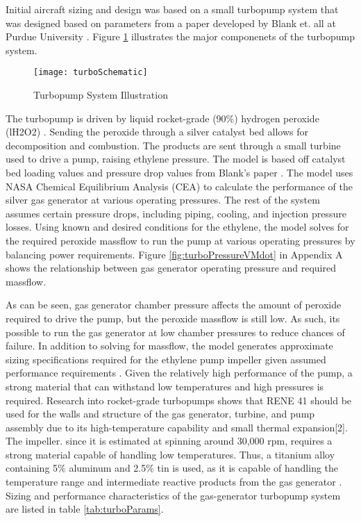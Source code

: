 Initial aircraft sizing and design was based on a small turbopump system that was designed based on parameters from a paper developed by Blank et. all at Purdue University \cite{catalyst}. Figure \ref{fig:turboSchematic} illustrates the major componenets of the turbopump system.

\begin{figure}[H]
\texttt{[image: turboSchematic]}
\caption{Turbopump System Illustration}
\label{fig:turboSchematic}
\end{figure}
 
The turbopump is driven by liquid rocket-grade (90\%) hydrogen peroxide (lH2O2) . Sending the peroxide through a silver catalyst bed allows for decomposition and combustion. The products are sent through a small turbine used to drive a pump, raising ethylene pressure. The model is based off catalyst bed loading values and pressure drop values from Blank’s paper \cite{catalyst}. The model uses NASA Chemical Equilibrium Analysis (CEA) to calculate the performance of the silver gas generator at various operating pressures. The rest of the system assumes certain pressure drops, including piping, cooling, and injection pressure losses. Using known and desired conditions for the ethylene, the model solves for the required peroxide massflow to run the pump at various operating pressures by balancing power requirements. Figure \ref{fig:turboPressureVMdot} in Appendix A shows the relationship between gas generator operating pressure and required massflow. 

As can be seen, gas generator chamber pressure affects the amount of peroxide required to drive the pump, but the peroxide massflow is still low. As such, its possible to run the gas generator at low chamber pressures to reduce chances of failure. In addition to solving for massflow, the model generates approximate sizing specifications required for the ethylene pump impeller given assumed performance requirements \cite{sutton}. Given the relatively high performance of the pump, a strong material that can withstand low temperatures and high pressures is required. Research into rocket-grade turbopumps \cite{turbo} shows that RENE 41 should be used for the walls and structure of the gas generator, turbine, and pump assembly due to its high-temperature capability and small thermal expansion[2]. The impeller. since it is estimated at spinning around 30,000 rpm, requires a strong material capable of handling low temperatures. Thus, a titanium alloy containing 5\% aluminum and 2.5\% tin is used, as it is capable of handling the temperature range and intermediate reactive products from the gas generator \cite{sutton}. Sizing and performance characteristics of the gas-generator turbopump system are listed in table \ref{tab:turboParams}. 

